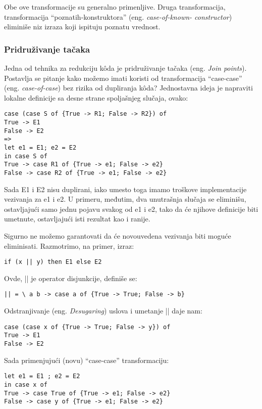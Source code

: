 Obe ove transformacije su generalno primenljive. Druga transformacija, transformacija “poznatih-konstruktora” (eng. \emph{case-of-known-
	constructor}) eliminiše niz izraza koji ispituju poznatu vrednost.

\subsubsection {Pridruživanje tačaka}
\label{sec:podpodnaslovJoin}

Jedna od tehnika za redukciju k\^{o}da je pridruživanje tačaka (eng. \emph{Join points}). Postavlja se pitanje kako možemo imati koristi od transformacija “case-case” (eng. \emph{case-of-case}) bez rizika od dupliranja k\^{o}da? Jednostavna ideja je napraviti lokalne definicije sa desne strane spoljašnjeg slučaja, ovako:
\begin{verbatim}
case (case S of {True -> R1; False -> R2}) of
True -> E1
False -> E2
=>
let e1 = E1; e2 = E2
in case S of
True -> case R1 of {True -> e1; False -> e2}
False -> case R2 of {True -> e1; False -> e2}
\end{verbatim}

Sada E1 i E2 nisu duplirani, iako umesto toga imamo troškove implementacije vezivanja za e1 i e2. U primeru, međutim, dva unutrašnja slučaja se eliminišu, ostavljajući samo jednu pojavu svakog od e1 i e2, tako da će njihove definicije biti umetnute, ostavljajući isti rezultat kao i ranije.

Sigurno ne možemo garantovati da će novouvedena vezivanja biti moguće eliminisati. Razmotrimo, na primer, izraz:
\begin{verbatim}
if (x || y) then E1 else E2
\end{verbatim}
Ovde, || je operator disjunkcije, definiše se:
\begin{verbatim}
|| = \ a b -> case a of {True -> True; False -> b}
\end{verbatim}

Odstranjivanje (eng. \emph{Desugaring}) uslova i umetanje || daje nam:
\begin{verbatim}
case (case x of {True -> True; False -> y}) of
True -> E1
False -> E2
\end{verbatim}

Sada primenjujući (novu) “case-case” transformaciju:
\begin{verbatim}
let e1 = E1 ; e2 = E2
in case x of
True -> case True of {True -> e1; False -> e2}
False -> case y of {True -> e1; False -> e2}
\end{verbatim}

